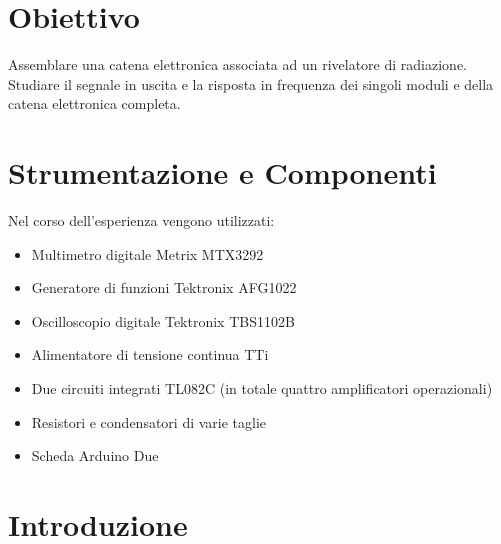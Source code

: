 \documentclass[a4paper,11pt]{article} %
\begin{document}

\section{Obiettivo}

Assemblare una catena elettronica associata ad un rivelatore di radiazione. Studiare il segnale in uscita e la risposta
in frequenza dei singoli moduli e della catena elettronica completa.


\section{Strumentazione e Componenti}\label{s:strumenti}

Nel corso dell'esperienza vengono utilizzati:
\begin{itemize}[itemsep=-0.5ex]
	\item Multimetro digitale Metrix MTX3292
	\item Generatore di funzioni Tektronix AFG1022
	\item Oscilloscopio digitale Tektronix TBS1102B
	\item Alimentatore di tensione continua TTi
	\item Due circuiti integrati TL082C (in totale quattro amplificatori operazionali)
	\item Resistori e condensatori di varie taglie
	\item Scheda Arduino Due
\end{itemize}


\section{Introduzione}\label{s:intro}
\end{document}
